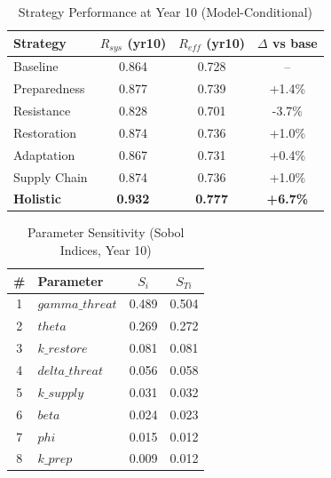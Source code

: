 \begin{table}[H]
\centering
\caption{Strategy Performance at Year 10 (Model-Conditional)}
\label{tab:strategy_live}
\scriptsize
\renewcommand{\arraystretch}{1.15}
\begin{tabular}{lccc}
\toprule
\textbf{Strategy} & \textbf{$R_{sys}$ (yr10)} & \textbf{$R_{eff}$ (yr10)} & \textbf{$\Delta$ vs base} \\
\midrule
Baseline & 0.864 & 0.728 & -- \\
Preparedness & 0.877 & 0.739 & +1.4\% \\
Resistance & 0.828 & 0.701 & -3.7\% \\
Restoration & 0.874 & 0.736 & +1.0\% \\
Adaptation & 0.867 & 0.731 & +0.4\% \\
Supply Chain & 0.874 & 0.736 & +1.0\% \\
\textbf{Holistic} & \textbf{0.932} & \textbf{0.777} & \textbf{+6.7\%} \\
\bottomrule
\end{tabular}
\end{table}

\begin{table}[H]
\centering
\caption{Parameter Sensitivity (Sobol Indices, Year 10)}
\label{tab:sobol_live}
\scriptsize
\renewcommand{\arraystretch}{1.15}
\begin{tabular}{clcc}
\toprule
\textbf{\#} & \textbf{Parameter} & \textbf{$S_i$} & \textbf{$S_{Ti}$} \\
\midrule
1 & $gamma\_threat$ & 0.489 & 0.504 \\
2 & $theta$ & 0.269 & 0.272 \\
3 & $k\_restore$ & 0.081 & 0.081 \\
4 & $delta\_threat$ & 0.056 & 0.058 \\
5 & $k\_supply$ & 0.031 & 0.032 \\
6 & $beta$ & 0.024 & 0.023 \\
7 & $phi$ & 0.015 & 0.012 \\
8 & $k\_prep$ & 0.009 & 0.012 \\
\bottomrule
\end{tabular}
\end{table}

